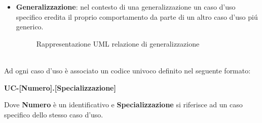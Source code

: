 \begin{itemize}
\begin{itemize}
\begin{figure}[H]
            \end{figure}
        \item \textbf{Generalizzazione}: nel contesto di una generalizzazione un caso d'uso specifico eredita il proprio comportamento da parte di un altro caso d'uso piú generico. 
            \begin{figure}[H]
                \centering
                \caption{Rappresentazione UML relazione di generalizzazione}
                \label{fig:Rappresentazione UML relazione di generalizzazione}
            \end{figure}
        \end{itemize}
\end{itemize}

\\
Ad ogni caso d'uso è associato un codice univoco definito nel seguente formato:
\begin{center}
    \textbf{UC-[Numero].[Specializzazione]}
\end{center}
Dove \textbf{Numero} è un identificativo e \textbf{Specializzazione} si riferisce ad un caso specifico
dello stesso caso d'uso.

